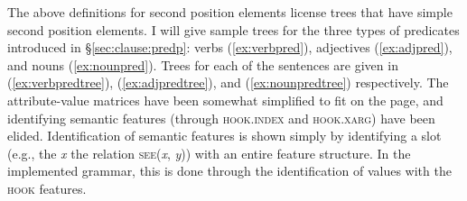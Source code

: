 The above definitions for second position elements license trees that have simple second position elements. I will give sample trees for the three types of predicates introduced in \S\ref{sec:clause:predp}: verbs (\ref{ex:verbpred}), adjectives (\ref{ex:adjpred}), and nouns (\ref{ex:nounpred}). Trees for each of the sentences are given in (\ref{ex:verbpredtree}), (\ref{ex:adjpredtree}), and (\ref{ex:nounpredtree}) respectively. The attribute-value matrices have been somewhat simplified to fit on the page, and identifying semantic features (through \textsc{hook.index} and \textsc{hook.xarg}) have been elided. Identification of semantic features is shown simply by identifying a slot (e.g., the \textit{x} the relation \textsc{see}(\textit{x}, \textit{y})) with an entire feature structure. In the implemented grammar, this is done through the identification of values with the \textsc{hook} features. %

